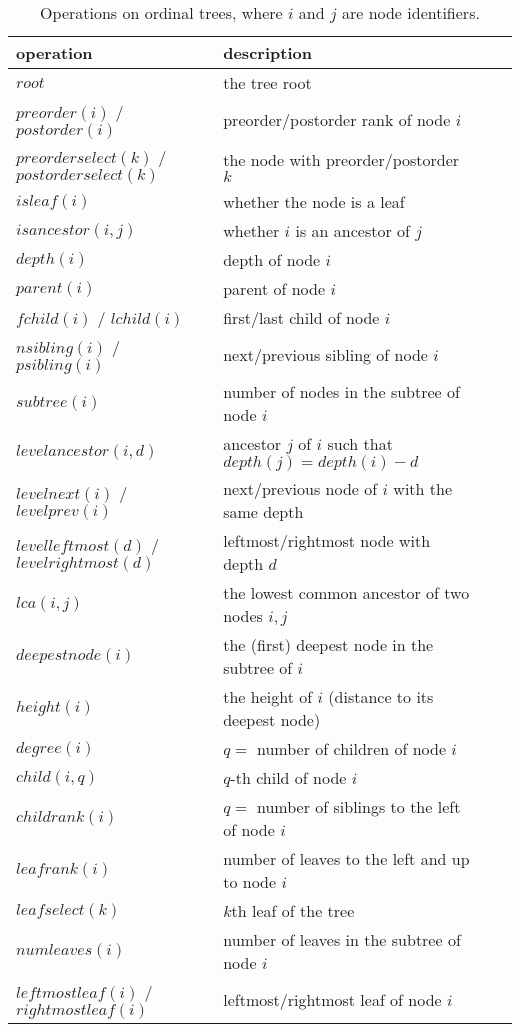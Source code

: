 \documentclass[11pt]{article}
\newcommand{\0}{\mathit{0}}
\newcommand{\1}{\mathit{1}}
\newcommand{\raiz}{\mathit{root}}
\newcommand{\fchild}{\mathit{fchild}}
\newcommand{\lchild}{\mathit{lchild}}
\newcommand{\nsibling}{\mathit{nsibling}}
\newcommand{\psibling}{\mathit{psibling}}
\newcommand{\parent}{\mathit{parent}}
\newcommand{\isleaf}{\mathit{isleaf}}
\newcommand{\degree}{\mathit{degree}}
\newcommand{\depth}{\mathit{depth}}
\newcommand{\height}{\mathit{height}}
\newcommand{\deepestnode}{\mathit{deepestnode}}
\newcommand{\subtree}{\mathit{subtree}}
\newcommand{\isancestor}{\mathit{isancestor}}
\newcommand{\levelanc}{\mathit{levelancestor}}
\newcommand{\preorder}{\mathit{preorder}}
\newcommand{\postorder}{\mathit{postorder}}
\newcommand{\preorderselect}{\mathit{preorderselect}}
\newcommand{\postorderselect}{\mathit{postorderselect}}
\newcommand{\child}{\mathit{child}}
\newcommand{\childrank}{\mathit{childrank}}
\newcommand{\lca}{\mathit{lca}}
\newcommand{\numleaves}{\mathit{numleaves}}
\newcommand{\leafrank}{\mathit{leafrank}}
\newcommand{\leafselect}{\mathit{leafselect}}
\newcommand{\leftmostleaf}{\mathit{leftmostleaf}}
\newcommand{\rightmostleaf}{\mathit{rightmostleaf}}
\newcommand{\levelnext}{\mathit{levelnext}}
\newcommand{\levelprev}{\mathit{levelprev}}
\newcommand{\levelleftmost}{\mathit{levelleftmost}}
\newcommand{\levelrightmost}{\mathit{levelrightmost}}
\begin{document}
\begin{table}[t!]
\caption{Operations on ordinal trees, where $i$ and $j$ are node identifiers.}
\label{tab:ops}
\footnotesize
\begin{center}
  \begin{tabular}{lll|l}
  operation & description \\ \hline
$\raiz$ & the tree root \\
  $\preorder(i)$ / $\postorder(i)$ & preorder/postorder rank of node $i$ \\
  $\preorderselect(k)$ / $\postorderselect(k)$ & the node with preorder/postorder $k$ \\
  $\isleaf(i)$ & whether the node is a leaf \\
  $\isancestor(i,j)$ & whether $i$ is an ancestor of $j$ \\
  $\depth(i)$ & depth of node $i$ \\
  $\parent(i)$ & parent of node $i$ \\
  $\fchild(i)$ / $\lchild(i)$ & first/last child of node $i$ \\
  $\nsibling(i)$ / $\psibling(i)$ & next/previous sibling of node $i$ \\
  $\subtree(i)$ & number of nodes in the subtree of node $i$ \\
  $\levelanc(i,d)$ & ancestor $j$ of $i$ such that $\depth(j) = \depth(i)-d$ \\
  $\levelnext(i)$ / $\levelprev(i)$ & next/previous node of $i$ with the same depth \\
  $\levelleftmost(d)$ / $\levelrightmost(d)$ & leftmost/rightmost node with depth $d$ \\
  $\lca(i,j)$ & the lowest common ancestor of two nodes $i,j$ \\
  $\deepestnode(i)$ & the (first) deepest node in the subtree of $i$ \\
  $\height(i)$ & the height of $i$ (distance to its deepest node) \\
  $\degree(i)$ & $q=$ number of children of node $i$ \\
  $\child(i,q)$ & $q$-th child of node $i$ \\
  $\childrank(i)$ & $q=$ number of siblings to the left of node $i$ \\
$\leafrank(i)$ & number of leaves to the left and up to node $i$ \\
  $\leafselect(k)$ & $k$th leaf of the tree \\
  $\numleaves(i)$ & number of leaves in the subtree of node $i$ \\
  $\leftmostleaf(i)$ / $\rightmostleaf(i)$ & leftmost/rightmost leaf of node $i$ \\
  \hline
  \end{tabular}
\end{center}
\end{table}
\end{document}
